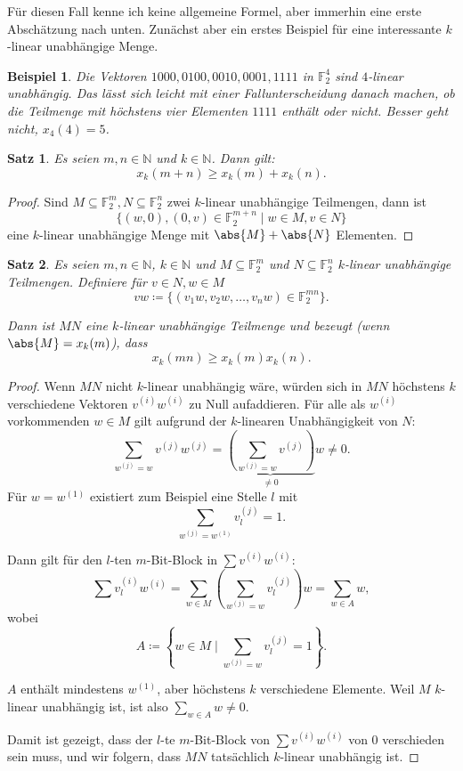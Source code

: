 \documentclass[a4paper]{scrartcl}
\theoremstyle{break}
\newtheorem{theorem}{Satz}
\newtheorem{example}{Beispiel}
\newcommand{\N}{\mathbb{N}}
\newcommand{\F}{\mathbb{F}}
\begin{document}
Für diesen Fall kenne ich keine allgemeine Formel, aber immerhin eine erste Abschätzung nach unten. Zunächst aber ein erstes Beispiel
für eine interessante $k$-linear unabhängige Menge.

\begin{example}
  Die Vektoren $1000, 0100, 0010, 0001, 1111$ in $\F_2^4$ sind $4$-linear unabhängig. Das lässt sich leicht mit einer Fallunterscheidung
  danach machen, ob die Teilmenge mit höchstens vier Elementen $1111$ enthält oder nicht. Besser geht nicht, $x_4(4) = 5$.
\end{example}

\begin{theorem}
  Es seien $m, n \in \N$ und $k \in \N$. Dann gilt:
  \[
    x_k(m + n) \ge x_k(m) + x_k(n)
  .\]
\end{theorem}
\begin{proof}
  Sind $M \subseteq \F_2^m, N \subseteq \F_2^n$ zwei $k$-linear unabhängige Teilmengen, dann ist
  \[
    \{ (w, 0), (0, v) \in \F_2^{m+n} \mid w \in M, v \in N \}
  \]
  eine $k$-linear unabhängige Menge mit $\abs{M} + \abs{N}$ Elementen.
\end{proof}

\begin{theorem}
  Es seien $m, n \in \N$, $k \in \N$ und $M \subseteq \F_2^m$ und $N \subseteq \F_2^n$ $k$-linear unabhängige Teilmengen.
  Definiere für $v\in N, w \in M$
  \[
      vw \coloneqq \{ (v_1 w, v_2 w, \ldots, v_n w) \in \F_2^{mn} \}
  .\]
  
  Dann ist $MN$ eine $k$-linear unabhängige Teilmenge und bezeugt (wenn $\abs{M} = x_k(m)$), dass
  \[
    x_k(mn) \ge x_k(m) x_k(n)
  .\]
\end{theorem}
\begin{proof}
  Wenn $MN$ nicht $k$-linear unabhängig wäre, würden sich in $MN$ höchstens $k$ verschiedene Vektoren $v^{(i)}w^{(i)}$ zu Null aufaddieren.
  Für alle als $w^{(i)}$ vorkommenden $w \in M$ gilt aufgrund der $k$-linearen Unabhängigkeit von $N$:
  \[
    \sum_{w^{(j)}=w} v^{(j)}w^{(j)} = \underbrace{\left(\sum_{w^{(j)} = w} v^{(j)}\right)}_{\ne 0}w \ne 0
  .\]
  Für $w = w^{(1)}$ existiert zum Beispiel eine Stelle $l$ mit
  \[
    \sum_{w^{(j)} = w^{(1)}} v^{(j)}_l = 1
  .\]
  
  Dann gilt für den $l$-ten $m$-Bit-Block in $\sum v^{(i)} w^{(i)}$:
  \[
    \sum v^{(i)}_l w^{(i)} = \sum_{w \in M} \left(\sum_{w^{(j)} = w} v^{(j)}_l\right)w = \sum_{w\in A} w
  ,\]
  wobei
  \[
    A \coloneqq \left\{ w\in M \mid \sum_{w^{(j)} = w} v^{(j)}_l = 1 \right\}
  .\]
  
  $A$ enthält mindestens $w^{(1)}$, aber höchstens $k$ verschiedene Elemente.
  Weil $M$ $k$-linear unabhängig ist, ist also $\sum_{w\in A} w \ne 0$.

  Damit ist gezeigt, dass der $l$-te $m$-Bit-Block von $\sum v^{(i)} w^{(i)}$ von $0$ verschieden sein muss,
  und wir folgern, dass $MN$ tatsächlich $k$-linear unabhängig ist.
\end{proof}
\end{document}
